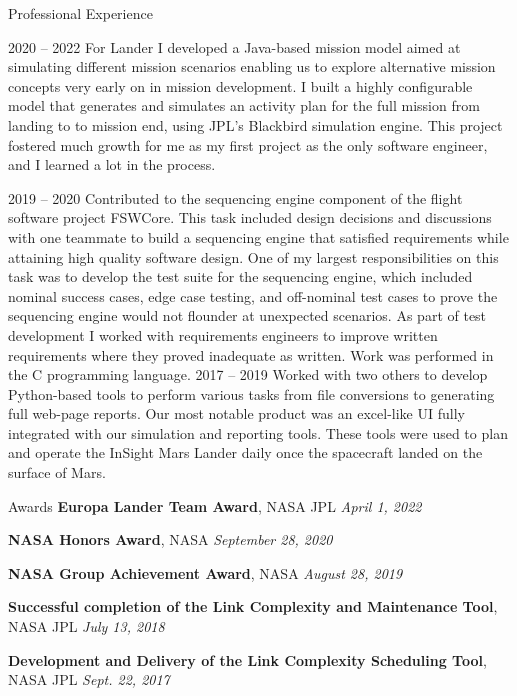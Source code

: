 \documentclass{resume} %
\begin{document}
\begin{rSection}{Professional Experience}{}
{        
        {}
        {2020 -- 2022}
        {
           For Lander I developed a Java-based mission model aimed at simulating different mission scenarios enabling us to explore alternative mission concepts very early on in mission development. I built a highly configurable model that generates and simulates an activity plan for the full mission from landing to to mission end, using JPL's Blackbird simulation engine. This project fostered much growth for me as my first project as the only software engineer, and I learned a lot in the process.
        }

        {}
        {2019 -- 2020}
        {
          Contributed to the sequencing engine component of the flight software project FSWCore. This task included design decisions and discussions with one teammate to build a sequencing engine that satisfied requirements while attaining high quality software design. One of my largest responsibilities on this task was to develop the test suite for the sequencing engine, which included nominal success cases, edge case testing, and off-nominal test cases to prove the sequencing engine would not flounder at unexpected scenarios. As part of test development I worked with requirements engineers to improve written requirements where they proved inadequate as written. Work was performed in the C programming language.
        }
        \newpage
        {}
        {2017 -- 2019}
        {
          Worked with two others to develop Python-based tools to perform various tasks from file conversions to generating full web-page reports. Our most notable product was an excel-like UI fully integrated with our simulation and reporting tools. These tools were used to plan and operate the InSight Mars Lander daily once the spacecraft landed on the surface of Mars.
        }

    }
\end{rSection}

\begin{rSection}{Awards}{}
  \textbf{Europa Lander Team Award}, NASA JPL
  \hfill
  \emph{April 1, 2022}

  \textbf{NASA Honors Award}, NASA
  \hfill
  \emph{September 28, 2020}

  \textbf{NASA Group Achievement Award}, NASA
  \hfill
  \emph{August 28, 2019}

  \textbf{Successful completion of the Link Complexity and Maintenance Tool}, NASA JPL
  \hfill
  \emph{July 13, 2018}

  \textbf{Development and Delivery of the Link Complexity Scheduling Tool}, NASA JPL
  \hfill
  \emph{Sept. 22, 2017}

\end{rSection}
\end{document}
